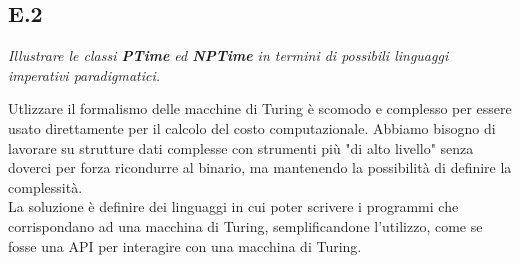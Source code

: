 \documentclass[a4paper]{article}
\begin{document}
\subsection{E.2}
\emph{Illustrare le classi \textbf{PTime} ed \textbf{NPTime} in termini di possibili linguaggi imperativi paradigmatici.}


Utlizzare il formalismo delle macchine di Turing è scomodo e complesso per essere usato direttamente per il calcolo del costo computazionale.
Abbiamo bisogno di lavorare su strutture dati complesse con strumenti più "di alto livello" senza doverci per forza ricondurre al binario, ma mantenendo la possibilità di definire la complessità.\\
La soluzione è definire dei linguaggi in cui poter scrivere i programmi che corrispondano ad una macchina di Turing, semplificandone l'utilizzo, come se fosse una API per interagire con una macchina di Turing.
\end{document}
